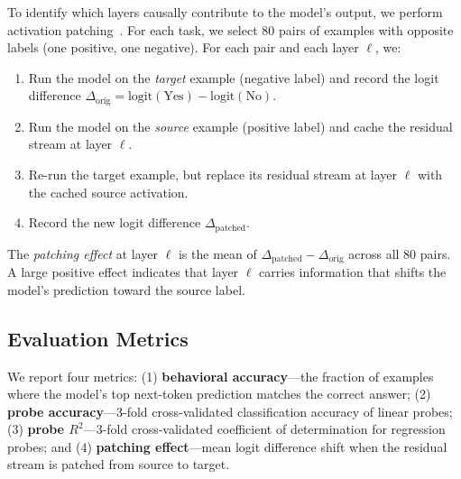 To identify which layers causally contribute to the model's output, we perform activation patching~\citep{elhage2021mathematical}. For each task, we select 80 pairs of examples with opposite labels (one positive, one negative). For each pair and each layer $\ell$, we:
\begin{enumerate}[leftmargin=*,itemsep=0pt,topsep=0pt]
    \item Run the model on the \emph{target} example (negative label) and record the logit difference $\Delta_{\text{orig}} = \text{logit}(\text{Yes}) - \text{logit}(\text{No})$.
    \item Run the model on the \emph{source} example (positive label) and cache the residual stream at layer $\ell$.
    \item Re-run the target example, but replace its residual stream at layer $\ell$ with the cached source activation.
    \item Record the new logit difference $\Delta_{\text{patched}}$.
\end{enumerate}
The \emph{patching effect} at layer $\ell$ is the mean of $\Delta_{\text{patched}} - \Delta_{\text{orig}}$ across all 80 pairs. A large positive effect indicates that layer $\ell$ carries information that shifts the model's prediction toward the source label.

\subsection{Evaluation Metrics}

We report four metrics: (1) \textbf{behavioral accuracy}---the fraction of examples where the model's top next-token prediction matches the correct answer; (2) \textbf{probe accuracy}---3-fold cross-validated classification accuracy of linear probes; (3) \textbf{probe $R^2$}---3-fold cross-validated coefficient of determination for regression probes; and (4) \textbf{patching effect}---mean logit difference shift when the residual stream is patched from source to target.
